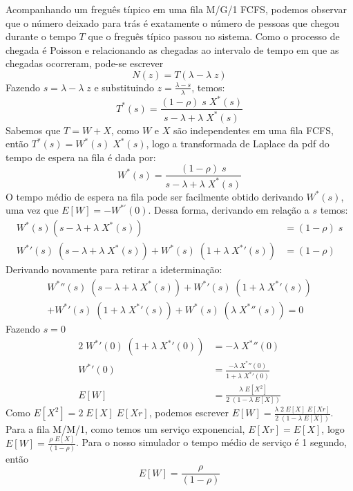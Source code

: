 \documentclass[a4paper]{article}
\newcommand{\E}[1]{E\!\left[#1\right]}
\begin{document}
Acompanhando um freguês tíıpico em uma fila M/G/1 FCFS,
podemos observar que o número deixado para trás é
exatamente o número de pessoas que chegou
durante o tempo \(T\) que o freguês típico passou no sistema.
Como o processo de chegada é Poisson
e relacionando as chegadas ao intervalo de tempo em
que as chegadas ocorreram,
pode-se escrever
\[
    N(z) = T(\lambda - \lambda \; z)
\]
Fazendo \(s = \lambda - \lambda \; z\)
e substituindo \(z = \frac{\lambda - s}{\lambda}\),
temos:
\[
    T^*(s) =
    \frac{(1 - \rho)\; s \; X^*(s)}{s - \lambda + \lambda \; X^*(s)}
\]
Sabemos que \(T = W + X\), como \(W\) e \(X\)
são independentes em uma fila FCFS,
então  \(T^*(s) =  W^*(s) \; X^*(s)\),
logo a transformada de Laplace
da pdf do tempo de espera na fila é dada por:
\[
    W^*(s) = \frac{(1 - \rho) \; s}{s - \lambda + \lambda \; X^*(s)}
\]
O tempo médio de espera na fila
pode ser facilmente obtido derivando \(W^{*}(s)\),
uma vez que \(E[W] = - W^{*'}(0)\).
Dessa forma, derivando em relação a \(s\) temos:
\begin{align*}
    W^*(s)(s - \lambda + \lambda \; X^*(s)) &= (1 - \rho) \; s \\
    {W^*}'(s) \; (s - \lambda + \lambda \; X^*(s))
        + W^*(s) \; (1 + \lambda \; {X^*}'(s)) &= (1 - \rho)
\end{align*}
Derivando novamente para retirar a ideterminação:
\begin{align*}
    {W^*}''(s) \; (s - \lambda + \lambda \; X^*(s))
        + {W^*}'(s) \; (1 + \lambda \; {X^*}'(s)) \\
        + {W^*}'(s) \; (1 + \lambda \; {X^*}'(s))
        + W^*(s) \; (\lambda \; {X^*}''(s)) = 0
\end{align*}
Fazendo \(s = 0\)
\begin{align*}
    2 \; {W^*}'(0) \; (1 + \lambda \; {X^*}'(0))
        &= - \lambda \; {X^*}''(0) \\
    {W^*}'(0)
        &= \frac{-\lambda \; {X^*}''(0)}{1 + \lambda \; {X^*}'(0)} \\
    \E{W} &= \frac{\lambda \; \E{X^2}}{2 \; (1 - \lambda \; \E{X})}
\end{align*}
Como \(\E{X^2} = 2 \; \E{X} \; \E{Xr}\),
podemos escrever
\(
    \E{W} = \frac{\lambda \; 2 \; \E{X} \; \E{Xr}}{2
        \; (1 - \lambda \; \E{X})}
\).
Para a fila M/M/1,
como temos um serviço exponencial,
\(E[Xr] = E[X]\),
logo \(\E{W} = \frac{\rho \; \E{X}}{(1 - \rho)}\).
Para o nosso simulador o tempo médio de serviço é 1 segundo,
então
\[
    \E{W} = \frac{\rho}{(1 - \rho)}
\]
\end{document}
